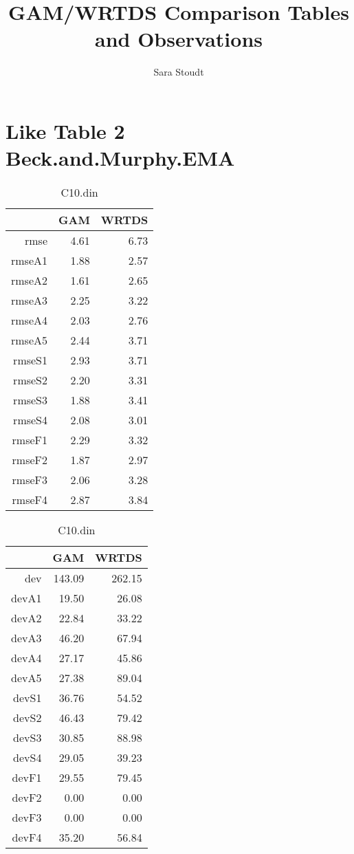 \documentclass[12pt]{amsart}
\title{GAM/WRTDS Comparison Tables and Observations}
\author{Sara Stoudt}
\begin{document}
\maketitle

\section{Like Table 2 Beck.and.Murphy.EMA}
\vspace{.1in}

\begin{table}[H]
\centering
\begin{tabular}{rrr}
  \hline
 & GAM & WRTDS \\ 
  \hline
rmse & 4.61 & 6.73 \\ 
  rmseA1 & 1.88 & 2.57 \\ 
  rmseA2 & 1.61 & 2.65 \\ 
  rmseA3 & 2.25 & 3.22 \\ 
  rmseA4 & 2.03 & 2.76 \\ 
  rmseA5 & 2.44 & 3.71 \\ 
  rmseS1 & 2.93 & 3.71 \\ 
  rmseS2 & 2.20 & 3.31 \\ 
  rmseS3 & 1.88 & 3.41 \\ 
  rmseS4 & 2.08 & 3.01 \\ 
  rmseF1 & 2.29 & 3.32 \\ 
  rmseF2 & 1.87 & 2.97 \\ 
  rmseF3 & 2.06 & 3.28 \\ 
  rmseF4 & 2.87 & 3.84 \\ 
   \hline
\end{tabular}
\caption{C10.din}
\end{table}
\begin{table}[H]
\centering
\begin{tabular}{rrr}
  \hline
 & GAM & WRTDS \\ 
  \hline
dev & 143.09 & 262.15 \\ 
  devA1 & 19.50 & 26.08 \\ 
  devA2 & 22.84 & 33.22 \\ 
  devA3 & 46.20 & 67.94 \\ 
  devA4 & 27.17 & 45.86 \\ 
  devA5 & 27.38 & 89.04 \\ 
  devS1 & 36.76 & 54.52 \\ 
  devS2 & 46.43 & 79.42 \\ 
  devS3 & 30.85 & 88.98 \\ 
  devS4 & 29.05 & 39.23 \\ 
  devF1 & 29.55 & 79.45 \\ 
  devF2 & 0.00 & 0.00 \\ 
  devF3 & 0.00 & 0.00 \\ 
  devF4 & 35.20 & 56.84 \\ 
   \hline
\end{tabular}
\caption{C10.din}
\end{table}
\end{document}
